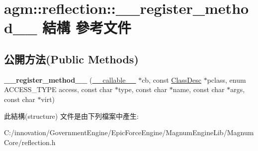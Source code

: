 \hypertarget{structagm_1_1reflection_1_1____register__method____}{}\section{agm\+:\+:reflection\+:\+:\+\_\+\+\_\+register\+\_\+method\+\_\+\+\_\+ 結構 參考文件}
\label{structagm_1_1reflection_1_1____register__method____}
\subsection*{公開方法(Public Methods)}
\begin{DoxyCompactItemize}
\item 
{\bfseries \+\_\+\+\_\+register\+\_\+method\+\_\+\+\_\+} (\hyperlink{structagm_1_1reflection_1_1____callable____}{\+\_\+\+\_\+callable\+\_\+\+\_\+} $\ast$cb, const \hyperlink{classagm_1_1reflection_1_1_class_desc}{Class\+Desc} $\ast$pclass, enum A\+C\+C\+E\+S\+S\+\_\+\+T\+Y\+PE access, const char $\ast$type, const char $\ast$name, const char $\ast$args, const char $\ast$virt)\hypertarget{structagm_1_1reflection_1_1____register__method_____aac424fb1384678320939461277f022fc}{}\label{structagm_1_1reflection_1_1____register__method_____aac424fb1384678320939461277f022fc}

\end{DoxyCompactItemize}


此結構(structure) 文件是由下列檔案中產生\+:\begin{DoxyCompactItemize}
\item 
C\+:/innovation/\+Government\+Engine/\+Epic\+Force\+Engine/\+Magnum\+Engine\+Lib/\+Magnum\+Core/reflection.\+h\end{DoxyCompactItemize}
